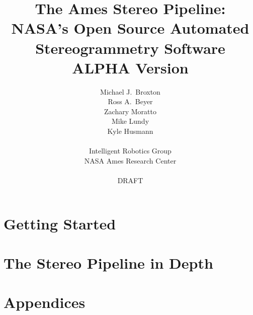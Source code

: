 \documentclass[letterpaper,fleqn,11pt]{book}
\title{{\Huge The Ames Stereo Pipeline:}\\NASA's Open Source Automated Stereogrammetry Software\\ALPHA Version}
\author{
Michael J.~Broxton\\
Ross A.~Beyer\\
Zachary Moratto\\
Mike Lundy\\
Kyle Husmann\\
\\
Intelligent Robotics Group\\
NASA Ames Research Center\\
\\
DRAFT}
\begin{document}
\frontmatter
\maketitle

\tableofcontents

\mainmatter

\fancyhead[LO]{\leftmark}



\part{Getting Started}



\part{The Stereo Pipeline in Depth}




\part{Appendices}
\appendix




% 



\end{document}
